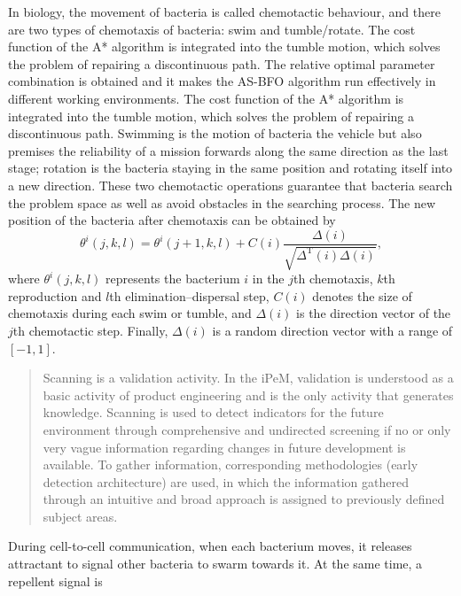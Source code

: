 \documentclass{PDS}%
\theoremstyle{definition}
\begin{document}

In biology, the movement of bacteria is called chemotactic behaviour, and there are two
types of chemotaxis of bacteria: swim and tumble/rotate. The cost function of the A* algorithm is integrated into the tumble motion, which
solves the problem of repairing a discontinuous path. The relative optimal parameter combination is obtained and it makes the AS-BFO algorithm
run effectively in different working environments. The cost function of the A* algorithm is integrated into the tumble motion, which
solves the problem of repairing a discontinuous path. Swimming is the motion of bacteria the vehicle but also premises the reliability of a mission forwards along the same direction as the last stage; rotation is the bacteria staying in the
same position and rotating itself into a new direction. These two chemotactic operations
guarantee that bacteria search the problem space as well as avoid obstacles in the
searching process. The new position of the bacteria after chemotaxis can be obtained by
\begin{equation}\label{equ:1}
\theta^i(j, k, l)=\theta^i(j+1, k, l)+ C(i)\frac{{\Delta ( i )}}
{{\sqrt {\Delta^\text{T} (i)\Delta ( i )} }},
\end{equation}
where $\theta^i(j, k, l)$ represents the bacterium $i$ in the $j$th chemotaxis, $k$th
reproduction and $l$th elimination--dispersal step, $C(i)$ denotes the size of chemotaxis
during each swim or tumble, and $\Delta (i)$ is the direction vector of the $j$th
chemotactic step. Finally, $\Delta (i)$ is a random direction vector with a range of $[-1, 1]$.
\begin{quote}
Scanning is a validation activity. In the iPeM, validation is understood as a basic
activity of product engineering and is the only activity that generates knowledge.
Scanning is used to detect indicators for the future environment through comprehensive
and undirected screening if no or only very vague information regarding changes in
future development is available. To gather information, corresponding methodologies
(early detection architecture) are used, in which the information gathered through an
intuitive and broad approach is assigned to previously defined subject areas.
\end{quote}
During cell-to-cell communication, when each bacterium moves, it releases attractant
to signal other bacteria to swarm towards it. At the same time, a repellent signal is
\end{document}
